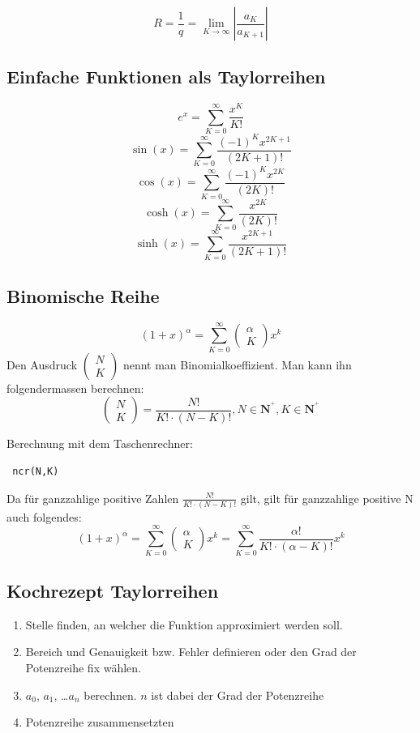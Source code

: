 \[ \boxed{R = \frac{1}{q} = \lim_{K \rightarrow \infty} \left| \frac{a_K}{a_{K + 1}} \right|} \]

\subsection{Einfache Funktionen als Taylorreihen}
\[ \boxed{e^x = \sum_{K=0}^{\infty} \frac{x^K}{K!}} \]
\[ \boxed{\sin(x) = \sum_{K=0}^{\infty} \frac{(-1)^K x^{2K+1}}{(2K+1)!}} \]
\[ \boxed{\cos(x) = \sum_{K=0}^{\infty} \frac{(-1)^K x^{2K}}{(2K)!}} \]
\[ \boxed{\cosh(x) = \sum_{K=0}^{\infty} \frac{x^{2K}}{(2K)!}} \]
\[ \boxed{\sinh(x) = \sum_{K=0}^{\infty} \frac{x^{2K+1}}{(2K+1)!}} \]

\subsection{Binomische Reihe}
\[ \boxed{(1 + x)^\alpha = \sum_{K=0}^{\infty}\left(\begin{matrix}\alpha\\K\end{matrix}\right)x^k } \]
Den Ausdruck \( \left(\begin{matrix}N\\K\end{matrix}\right) \) nennt man Binomialkoeffizient. Man kann ihn folgendermassen berechnen:
\[ \boxed{\left(\begin{matrix}N\\K\end{matrix}\right) = \frac{N !}{K! \cdot (N - K)!}, N \in \mathbf{N}^{{}^{\ensuremath{\!+\!}}}_{}, K \in \mathbf{N}^{{}^{\ensuremath{\!+\!}}}_{} } \]

\iftiboth
Berechnung mit dem Taschenrechner:
\begin{verbatim} ncr(N,K) \end{verbatim}
\fi

Da für ganzzahlige positive Zahlen \( \frac{N !}{K! \cdot (N - K)!} \) gilt, gilt für ganzzahlige positive N auch folgendes:
\[ \boxed{(1 + x)^\alpha = \sum_{K=0}^{\infty}\left(\begin{matrix}\alpha\\K\end{matrix}\right)x^k = \sum_{K=0}^{\infty}\frac{\alpha !}{K! \cdot (\alpha - K)!}x^k} \]

\subsection{Kochrezept Taylorreihen}
\begin{enumerate}
  \item Stelle finden, an welcher die Funktion approximiert werden soll. 
  \item Bereich und Genauigkeit bzw. Fehler definieren oder den Grad der Potenzreihe fix wählen. 
  \item $a_0$, $a_1$, \dots $a_n$ berechnen. $n$ ist dabei der Grad der Potenzreihe
  \item Potenzreihe zusammensetzten
\end{enumerate}

